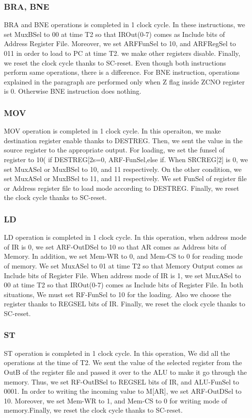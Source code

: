 \documentclass[pdftex,12pt,a4paper]{article}
\begin{document}
\subsubsection{BRA, BNE}
BRA and BNE operations is completed in 1 clock cycle. In these instructions, we set MuxBSel to 00 at time T2 so that IROut(0-7) comes as Include bits of Address Register File. Moreover, we set ARFFunSel to 10, and ARFRegSel to 011 in order to load to PC at time T2. we make other registers disable. Finally, we reset the clock cycle thanks to SC-reset. Even though both instructions perform same operations, there is a difference. For BNE instruction, operations explained in the paragraph are performed only when Z flag inside ZCNO register is 0. Otherwise BNE instruction does nothing.
\subsubsection{MOV}
MOV operation is completed in 1 clock cycle. In this operaiton, we make destination register enable thanks to DESTREG. Then, we sent the value in the source register to the appropriate output. For loading, we set the funsel of register to 10( if DESTREG[2s=0, ARF-FunSel,else if. When SRCREG[2] is 0, we set MuxASel or MuxBSel to 10, and 11 respectively. On the other condition, we set MuxASel or MuxBSel to 11, and 11 respectively. We set FunSel of register file or Address register file to load mode according to DESTREG. Finally, we reset the clock cycle thanks to SC-reset.
\subsubsection{LD}
LD operation is completed in 1 clock cycle. In this operation, when address mode of IR is 0, we set ARF-OutDSel to 10 so that AR comes as Address bits of Memory. In addition, we set Mem-WR to 0, and Mem-CS to 0 for reading mode of memory. We set MuxASel to 01 at time T2 so that Memory Output comes as Include bits of Register File.
When address mode of IR is 1, we set MuxASel to 00 at time T2 so that IROut(0-7) comes as Include bits of Register File.
In both situations, We must set RF-FunSel to 10 for the loading. Also we choose the register thanks to REGSEL bits of IR.
Finally, we reset the clock cycle thanks to SC-reset.
\subsubsection{ST}
ST operation is completed in 1 clock cycle. In this operation, We did all the operations at the time of T2. We sent the value of the selected register from the OutB of the register file and passed it over to the ALU to make it go through the memory. Thus, we set RF-OutBSel to REGSEL bits of IR, and ALU-FunSel to 0001. In order to writing the incoming value to M[AR], we set ARF-OutDSel to 10. Moreover, we set Mem-WR to 1, and Mem-CS to 0 for writing mode of memory.Finally, we reset the clock cycle thanks to SC-reset.
\end{document}
